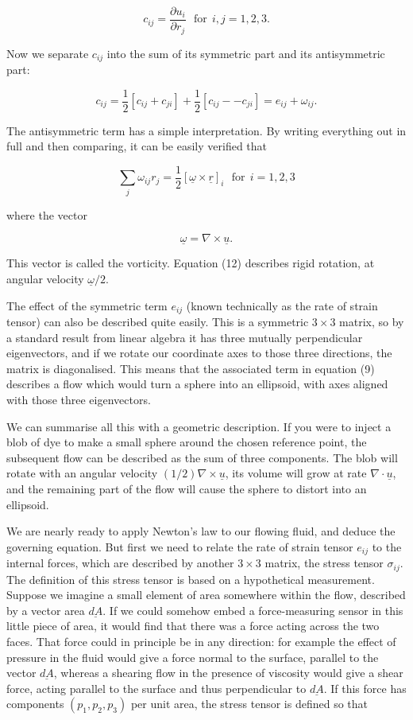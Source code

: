   $$c_{ij} = \dfrac{\partial u_i}{\partial r_j} \mathrm{~~~for~~}i,j=1,2,3 . 
  \tag{10}$$ 

  Now we separate $c_{ij}$ into the sum of its symmetric part and its 
  antisymmetric part: 

  $$c_{ij} = \frac{1}{2}\left[c_{ij} + c_{ji} \right]+\frac{1}{2}\left[c_{ij} 
  -- c_{ji} \right] = e_{ij} + \omega_{ij} . \tag{11}$$ 

  The antisymmetric term has a simple interpretation. By writing everything out 
  in full and then comparing, it can be easily verified that 

  $$\sum_j{\omega_{ij} r_j}=\frac{1}{2}[\underline{\omega} \times 
  \underline{r}]_i \mathrm{~~~for~~}i=1,2,3 \tag{12}$$ 

  where the vector 

  $$\underline{\omega} = \nabla \times \underline{u} .\tag{13}$$ 

  This vector is called the vorticity. Equation (12) describes rigid rotation, 
  at angular velocity $\underline{\omega}/2$. 

  The effect of the symmetric term $e_{ij}$ (known technically as the rate of 
  strain tensor) can also be described quite easily. This is a symmetric $3 
  \times 3$ matrix, so by a standard result from linear algebra it has three 
  mutually perpendicular eigenvectors, and if we rotate our coordinate axes to 
  those three directions, the matrix is diagonalised. This means that the 
  associated term in equation (9) describes a flow which would turn a sphere 
  into an ellipsoid, with axes aligned with those three eigenvectors. 

  We can summarise all this with a geometric description. If you were to inject 
  a blob of dye to make a small sphere around the chosen reference point, the 
  subsequent flow can be described as the sum of three components. The blob 
  will rotate with an angular velocity $(1/2)\nabla \times \underline{u}$, its 
  volume will grow at rate $\nabla \cdot \underline{u}$, and the remaining part 
  of the flow will cause the sphere to distort into an ellipsoid. 

  We are nearly ready to apply Newton's law to our flowing fluid, and deduce 
  the governing equation. But first we need to relate the rate of strain tensor 
  $e_{ij}$ to the internal forces, which are described by another $3 \times 3$ 
  matrix, the stress tensor $\sigma_{ij}$. The definition of this stress tensor 
  is based on a hypothetical measurement. Suppose we imagine a small element of 
  area somewhere within the flow, described by a vector area $\underline{dA}$. 
  If we could somehow embed a force-measuring sensor in this little piece of 
  area, it would find that there was a force acting across the two faces. That 
  force could in principle be in any direction: for example the effect of 
  pressure in the fluid would give a force normal to the surface, parallel to 
  the vector $\underline{dA}$, whereas a shearing flow in the presence of 
  viscosity would give a shear force, acting parallel to the surface and thus 
  perpendicular to $\underline{dA}$. If this force has components 
  $(p_1,p_2,p_3)$ per unit area, the stress tensor is defined so that 

